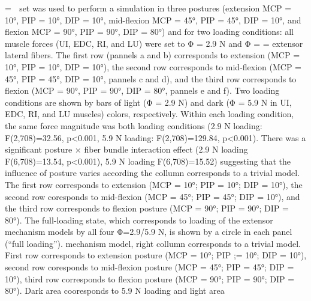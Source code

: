 = 
set was used to perform a simulation in three postures (extension MCP = 10°, PIP = 10°, DIP = 10°,
mid-flexion MCP = 45°, PIP = 45°, DIP = 10°, and flexion MCP = 90°, PIP = 90°, DIP = 80°) and for
two loading conditions: all muscle forces (UI, EDC, RI, and LU) were set to Φ = 2.9 N and Φ =
=
extensor lateral fibers. The first row (pannels a and b) corresponds to extension (MCP = 10°, PIP = 10°, DIP = 10°), the second
row corresponds to mid-flexion (MCP = 45°, PIP = 45°, DIP = 10°, pannels c and d), and the third row corresponds to flexion
(MCP = 90°, PIP = 90°, DIP = 80°, pannels e and f). Two loading conditions are shown by bars of light (Φ = 2.9 N) and dark
(Φ = 5.9 N in UI, EDC, RI, and LU muscles) colors, respectively. Within each loading condition, the same force magnitude was
both loading conditions (2.9 N loading: F(2,708)=32.56, p<0.001, 5.9 N loading: F(2,708)=129.84,
p<0.001). There was a significant posture × fiber bundle interaction effect (2.9 N loading F(6,708)=13.54,
p<0.001), 5.9 N loading F(6,708)=15.52) suggesting that the influence of posture varies according the
collumn corresponds to a trivial model. The first row corresponds to extension  (MCP = 10°; PIP = 10°; DIP = 10°), the second
row coresponds to mid-flexion (MCP = 45°; PIP = 45°; DIP = 10°), and the third row corresponds to flexion posture (MCP =
90°; PIP = 90°; DIP = 80°). The full-loading state, which corresponds to loading of the extensor mechanism models by all four
Φ=2.9/5.9 N, is shown by a circle in each panel (“full loading”).
mechanism model, right collumn corresponds to a trivial model. First row corresponds to  extension posture (MCP = 10°;
PIP ;= 10°; DIP = 10°), second row coresponds to mid-flexion posture (MCP = 45°; PIP = 45°; DIP = 10°), third row
corresponds to flexion posture (MCP = 90°; PIP = 90°; DIP = 80°). Dark area cooresponds to 5.9 N loading and light area

